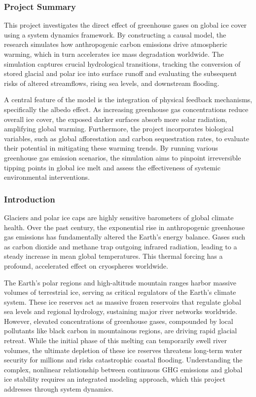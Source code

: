 \documentclass[12pt, a4paper]{article}
\begin{document}
\subsubsection*{Project Summary}

This project investigates the direct effect of greenhouse gases on global ice cover using a system dynamics framework. By constructing a causal model, the research simulates how anthropogenic carbon emissions drive atmospheric warming, which in turn accelerates ice mass degradation worldwide. The simulation captures crucial hydrological transitions, tracking the conversion of stored glacial and polar ice into surface runoff and evaluating the subsequent risks of altered streamflows, rising sea levels, and downstream flooding.

A central feature of the model is the integration of physical feedback mechanisms, specifically the albedo effect. As increasing greenhouse gas concentrations reduce overall ice cover, the exposed darker surfaces absorb more solar radiation, amplifying global warming. Furthermore, the project incorporates biological variables, such as global afforestation and carbon sequestration rates, to evaluate their potential in mitigating these warming trends. By running various greenhouse gas emission scenarios, the simulation aims to pinpoint irreversible tipping points in global ice melt and assess the effectiveness of systemic environmental interventions.

\subsubsection*{Introduction}

Glaciers and polar ice caps are highly sensitive barometers of global climate health. Over the past century, the exponential rise in anthropogenic greenhouse gas emissions has fundamentally altered the Earth's energy balance. Gases such as carbon dioxide and methane trap outgoing infrared radiation, leading to a steady increase in mean global temperatures. This thermal forcing has a profound, accelerated effect on cryospheres worldwide.

The Earth's polar regions and high-altitude mountain ranges harbor massive volumes of terrestrial ice, serving as critical regulators of the Earth's climate system. These ice reserves act as massive frozen reservoirs that regulate global sea levels and regional hydrology, sustaining major river networks worldwide. However, elevated concentrations of greenhouse gases, compounded by local pollutants like black carbon in mountainous regions, are driving rapid glacial retreat. While the initial phase of this melting can temporarily swell river volumes, the ultimate depletion of these ice reserves threatens long-term water security for millions and risks catastrophic coastal flooding. Understanding the complex, nonlinear relationship between continuous GHG emissions and global ice stability requires an integrated modeling approach, which this project addresses through system dynamics.
\end{document}
